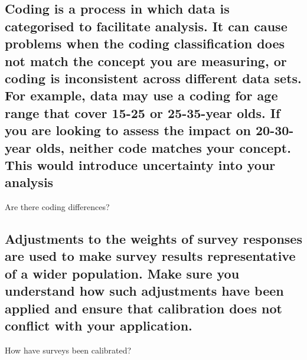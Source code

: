 \documentclass[]{book}
\begin{document}
\subsection{Coding is a process in which data is categorised to
facilitate analysis. It can cause problems when the coding
classification does not match the concept you are measuring, or coding
is inconsistent across different data sets. For example, data may use a
coding for age range that cover 15-25 or 25-35-year olds. If you are
looking to assess the impact on 20-30-year olds, neither code matches
your concept. This would introduce uncertainty into your
analysis}\label{coding-is-a-process-in-which-data-is-categorised-to-facilitate-analysis.-it-can-cause-problems-when-the-coding-classification-does-not-match-the-concept-you-are-measuring-or-coding-is-inconsistent-across-different-data-sets.-for-example-data-may-use-a-coding-for-age-range-that-cover-15-25-or-25-35-year-olds.-if-you-are-looking-to-assess-the-impact-on-20-30-year-olds-neither-code-matches-your-concept.-this-would-introduce-uncertainty-into-your-analysis}

 Are there coding differences?

\subsection{Adjustments to the weights of survey responses are used to
make survey results representative of a wider population. Make sure you
understand how such adjustments have been applied and ensure that
calibration does not conflict with your
application.}\label{adjustments-to-the-weights-of-survey-responses-are-used-to-make-survey-results-representative-of-a-wider-population.-make-sure-you-understand-how-such-adjustments-have-been-applied-and-ensure-that-calibration-does-not-conflict-with-your-application.}

 How have surveys been calibrated?
\end{document}
